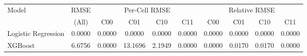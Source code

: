 \begin{tabular}{l c cccc cccc}
\toprule
Model & RMSE & \multicolumn{4}{c}{Per-Cell RMSE} & \multicolumn{4}{c}{Relative RMSE} \\
 & (All) & C00 & C01 & C10 & C11 & C00 & C01 & C10 & C11 \\
\midrule
Logistic Regression & 0.0000 & 0.0000 & 0.0000 & 0.0000 & 0.0000 & 0.0000 & 0.0000 & 0.0000 & 0.0000 \\
XGBoost & 6.6756 & 0.0000 & 13.1696 & 2.1949 & 0.0000 & 0.0000 & 0.0170 & 0.0170 & 0.0000 \\
\bottomrule
\end{tabular}
